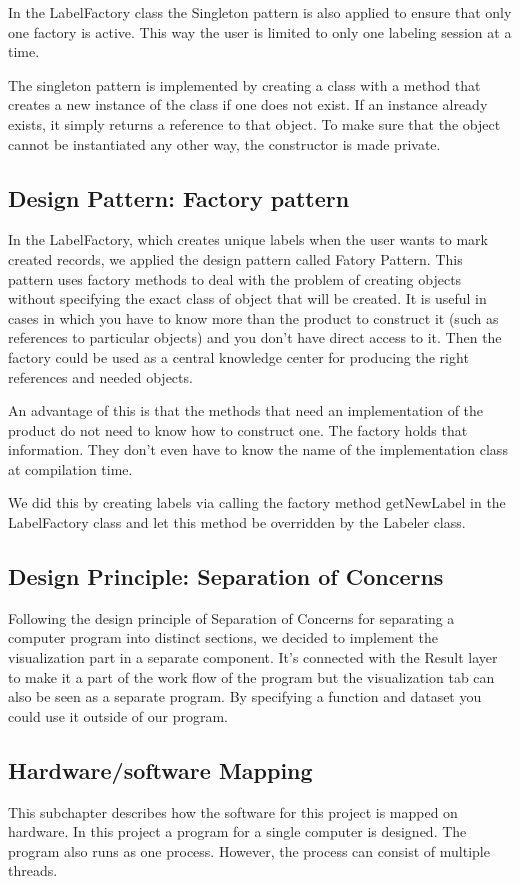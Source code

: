 \documentclass[a4paper,english,fleqn]{exam}
\begin{document}
In the LabelFactory class the Singleton pattern is also applied to ensure that only one factory is active. This way the user is limited to only one labeling session at a time.

The singleton pattern is implemented by creating a class with a method that creates a new instance of the class if one does not exist. If an instance already exists, it simply returns a reference to that object. To make sure that the object cannot be instantiated any other way, the constructor is made private. 

\subsection{Design Pattern: Factory pattern}
In the LabelFactory, which creates unique labels when the user wants to mark created records, we applied the design pattern called Fatory Pattern. This pattern uses factory methods to deal with the problem of creating objects without specifying the exact class of object that will be created. It is useful in cases in which you have to know more than the product to construct it (such as references to particular objects) and you don't have direct access to it. Then the factory could be used as a central knowledge center for producing the right references and needed objects.

An advantage of this is that the methods that need an implementation of the product do not need to know how to construct one. The factory holds that information. They don't even have to know the name of the implementation class at compilation time.

We did this by creating labels via calling the factory method getNewLabel in the LabelFactory class and let this method be overridden by the Labeler class. 

\subsection{Design Principle: Separation of Concerns}
Following the design principle of Separation of Concerns for separating a computer program into distinct sections, we decided to implement the visualization part in a separate component. It's connected with the Result layer to make it a part of the work flow of the program but the visualization tab can also be seen as a separate program. By specifying a function and dataset you could use it outside of our program. 

\subsection{Hardware/software Mapping}
This subchapter describes how the software for this project is mapped on hardware. In this project a program for a single computer is designed. The program also runs as one process. However, the process can consist of multiple threads. 
\end{document}
